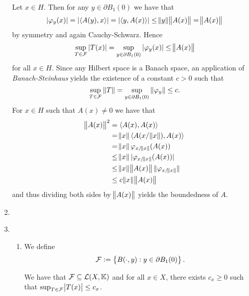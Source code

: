 \begin{enumerate}[label = \textbf{Exercise \arabic*.},wide = 0pt, itemsep = 1.5ex]
		Let $x \in H$. Then for any $y \in \partial B_1(0)$ we have that
		\begin{equation*}
			\abs[0]{\varphi_y(x)} = \abs[0]{\langle A(y),x \rangle} = \abs[0]{\langle y,A(x) \rangle} \leq \norm{y} \norm{A(x)} = \norm{A(x)}
		\end{equation*}
		\noindent by symmetry and again Cauchy-Schwarz. Hence
		\begin{equation*}
			\sup_{T \in \Fcal}\abs[0]{T(x)} = \sup_{y \in \partial B_1(0)} \abs[0]{\varphi_y(x)} \leq \norm{A (x)}
		\end{equation*}
		\noindent for all $x \in H$. Since any Hilbert space is a Banach space, an application of \emph{Banach-Steinhaus} yields the existence of a constant $c > 0$ such that
		\begin{equation*}
			\sup_{T \in \Fcal}\norm[0]{T} = \sup_{y \in \partial B_1(0)} \norm[0]{\varphi_y} \leq c.
		\end{equation*}
		For $x \in H$ such that $A(x) \neq 0$ we have that
		\begin{align*}
			\norm{A(x)}^2 &= \langle A(x),A(x) \rangle\\
			&= \norm{x} \langle A(x / \norm{x}), A(x)\rangle\\
			&= \norm{x} \varphi_{x/\norm{x}}(A(x))\\
			&\leq \norm{x} \abs[0]{\varphi_{x/\norm{x}}(A(x))}\\
			&\leq \norm{x} \norm{A(x)} \norm[0]{\varphi_{x/\norm{x}}}\\
			&\leq c\norm{x} \norm{A(x)}
		\end{align*}
		\noindent and thus dividing both sides by $\norm{A(x)}$ yields the boundedness of $A$.

	\item

	\item
		~
		\begin{enumerate}[label = \textbf{\alph*.},wide = 0pt, itemsep = 1.5ex]
			\item We define
				\begin{equation*}
					\Fcal := \cbr{B(\cdot,y) : y \in \partial B_1(0)}.
				\end{equation*}

				\begin{lemma}
					We have that $\mathcal{F} \subseteq \mathcal{L}(X,\mathbb{K})$ and for all $x \in X$, there exists $c_x \geq 0$ such that $\sup_{T \in \Fcal}\abs{T(x)} \leq c_x$.
				\end{lemma}


\end{enumerate}
\end{enumerate}
